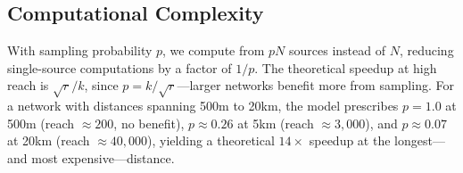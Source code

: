 \subsection{Computational Complexity}

With sampling probability $p$, we compute from $pN$ sources instead of $N$, reducing single-source computations by a factor of $1/p$. The theoretical speedup at high reach is $\sqrt{r}/k$, since $p = k/\sqrt{r}$---larger networks benefit more from sampling. For a network with distances spanning 500m to 20km, the model prescribes $p = 1.0$ at 500m (reach $\approx 200$, no benefit), $p \approx 0.26$ at 5km (reach $\approx 3{,}000$), and $p \approx 0.07$ at 20km (reach $\approx 40{,}000$), yielding a theoretical $14\times$ speedup at the longest---and most expensive---distance.

